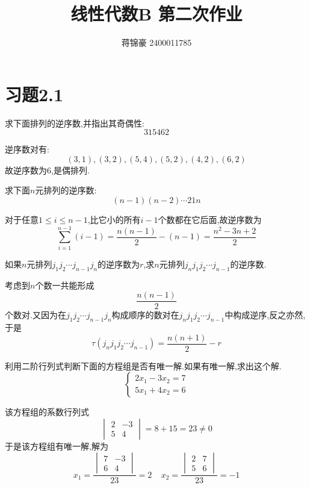 \documentclass{ctexart}
\title{线性代数B  第二次作业}
\author{蒋锦豪 2400011785}
\date{}
\begin{document}
\maketitle
\section*{习题2.1}
\begin{homework}[1(1)]
    求下面排列的逆序数,并指出其奇偶性:
    \[315462\]
\end{homework}
\begin{solution}
    逆序数对有:
    \[(3,1),(3,2),(5,4),(5,2),(4,2),(6,2)\]
    故逆序数为$6$,是偶排列.
\end{solution}
\begin{homework}[2(1)]
    求下面$n$元排列的逆序数:
    \[(n-1)(n-2)\cdots21n\]
\end{homework}
\begin{solution}
    对于任意$1\leqslant i\leqslant n-1$,比它小的所有$i-1$个数都在它后面,故逆序数为
    \[\sum_{i=1}^{n-1}(i-1)=\dfrac{n(n-1)}{2}-(n-1)=\dfrac{n^2-3n+2}{2}\]
\end{solution}
\begin{homework}[5]
    如果$n$元排列$j_1j_2\cdots j_{n-1}j_n$的逆序数为$r$,求$n$元排列$j_nj_1j_2\cdots j_{n-1}$的逆序数.
\end{homework}
\begin{solution}
    考虑到$n$个数一共能形成
    \[\dfrac{n(n-1)}{2}\]
    个数对.又因为在$j_1j_2\cdots j_{n-1}j_n$构成顺序的数对在$j_nj_1j_2\cdots j_{n-1}$中构成逆序,反之亦然,于是
    \[\tau\left(j_nj_1j_2\cdots j_{n-1}\right)=\dfrac{n(n+1)}{2}-r\]
\end{solution}
\begin{homework}[7]
    利用二阶行列式判断下面的方程组是否有唯一解.如果有唯一解,求出这个解.
    \[\left\{\begin{array}{l}
        2x_1-3x_2=7\\
        5x_1+4x_2=6
    \end{array}\right.\]
\end{homework}
\begin{solution}
    该方程组的系数行列式
    \[\begin{vmatrix}
        2&-3\\5&4
    \end{vmatrix}=8+15=23\neq0\]
    于是该方程组有唯一解,解为
    \[x_1=\dfrac{\begin{vmatrix}
        7&-3\\6&4
    \end{vmatrix}}{23}=2\ \ \ \ \ x_2=\dfrac{\begin{vmatrix}
        2&7\\5&6
    \end{vmatrix}}{23}=-1\]
\end{solution}
\end{document}
